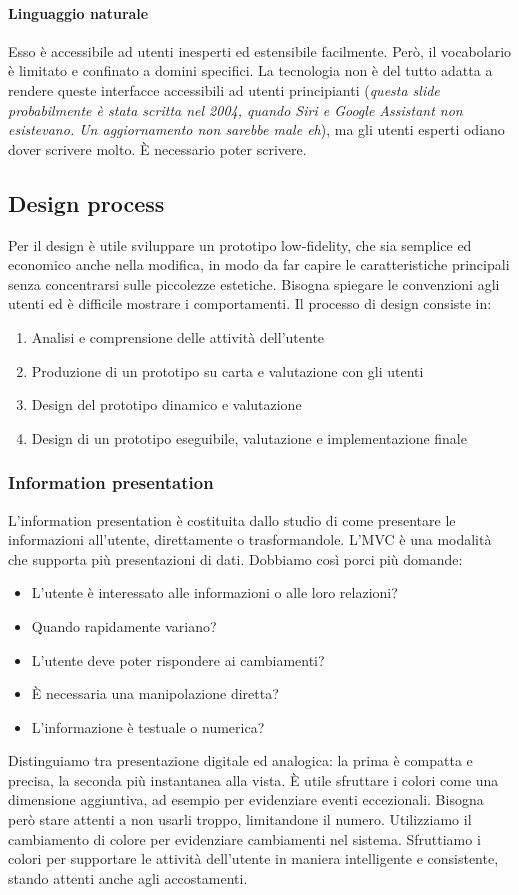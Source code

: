 \documentclass[11pt]{article}
\begin{document}
\paragraph{Linguaggio naturale} Esso è accessibile ad utenti inesperti ed estensibile facilmente. Però, il vocabolario è limitato e confinato a domini specifici. La tecnologia non è del tutto adatta a rendere queste interfacce accessibili ad utenti principianti (\textit{questa slide probabilmente è stata scritta nel 2004, quando Siri e Google Assistant non esistevano. Un aggiornamento non sarebbe male eh}), ma gli utenti esperti odiano dover scrivere molto. È necessario poter scrivere. 
\subsection{Design process}
Per il design è utile sviluppare un prototipo low-fidelity, che sia semplice ed economico anche nella modifica, in modo da far capire le caratteristiche principali senza concentrarsi sulle piccolezze estetiche. Bisogna spiegare le convenzioni agli utenti ed è difficile mostrare i comportamenti. Il processo di design consiste in:
\begin{enumerate}
    \item Analisi e comprensione delle attività dell'utente 
    \item Produzione di un prototipo su carta e valutazione con gli utenti 
    \item Design del prototipo dinamico e valutazione
    \item Design di un prototipo eseguibile, valutazione e implementazione finale 
\end{enumerate}
\subsubsection{Information presentation}
L'information presentation è costituita dallo studio di come presentare le informazioni all'utente, direttamente o trasformandole. L'MVC è una modalità che supporta più presentazioni di dati. 
Dobbiamo così porci più domande: 
\begin{itemize}
    \item L'utente è interessato alle informazioni o alle loro relazioni?
    \item Quando rapidamente variano?
    \item L'utente deve poter rispondere ai cambiamenti?
    \item È necessaria una manipolazione diretta?
    \item L'informazione è testuale o numerica? 
\end{itemize}
Distinguiamo tra presentazione digitale ed analogica: la prima è compatta e precisa, la seconda più instantanea alla vista. 
È utile sfruttare i colori come una dimensione aggiuntiva, ad esempio per evidenziare eventi eccezionali. Bisogna però stare attenti a non usarli troppo, limitandone il numero. Utilizziamo il cambiamento di colore per evidenziare cambiamenti nel sistema. Sfruttiamo i colori per supportare le attività dell'utente in maniera intelligente e consistente, stando attenti anche agli accostamenti. 
\end{document}
